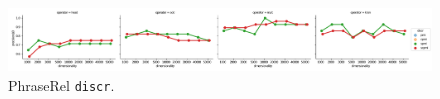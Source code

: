 \begin{figure}
  \centering

  \includegraphics[width=1.1\textwidth]{supplement/figures/phraserel-interaction-discr}

  \caption{PhraseRel \texttt{discr}.}
  \label{fig:phraserel-discr}
\end{figure}

